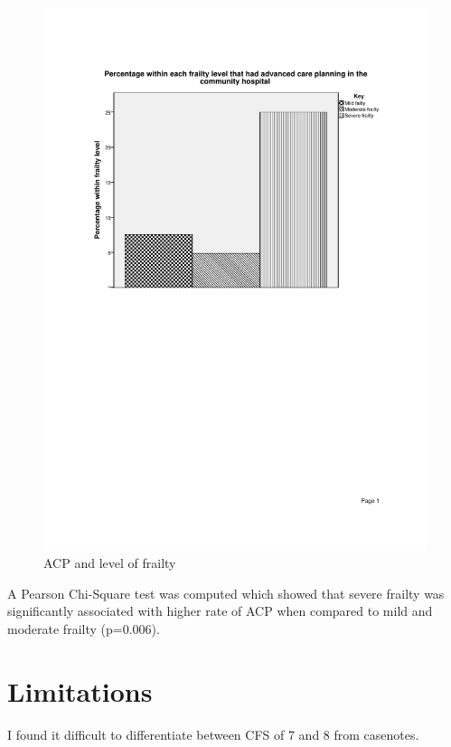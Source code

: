 \documentclass
[
	12pt,
	a4paper,
	oneside,
]{report}
\begin{document}
\begin{figure}[ht]
\caption{ACP and level of frailty}
\label{fig:chart-frailty-level-acp}
\includegraphics[width=\textwidth,
	trim={2.5cm 14cm 2.5cm 2.5cm},
	clip]{media/graph-frailty-level-acp}
\end{figure}

A Pearson Chi-Square test was computed which showed that severe frailty was
significantly associated with higher rate of ACP when compared to mild and
moderate frailty (p=0.006).




\section{Limitations}
I found it difficult to differentiate between CFS of 7 and 8 from casenotes.
\end{document}
